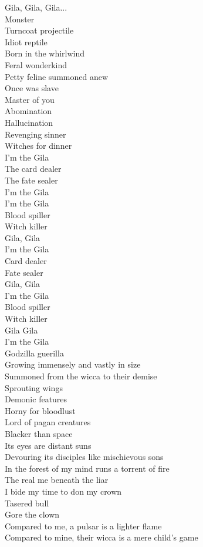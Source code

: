 Gila, Gila, Gila... \\
Monster \\

Turncoat projectile \\
Idiot reptile \\
Born in the whirlwind \\
Feral wonderkind \\
Petty feline summoned anew \\
Once was slave \\
Master of you \\
Abomination \\
Hallucination \\
Revenging sinner \\
Witches for dinner \\
I'm the Gila \\
The card dealer \\
The fate sealer \\
I'm the Gila \\

I'm the Gila \\
Blood spiller \\
Witch killer \\
Gila, Gila \\
I'm the Gila \\
Card dealer \\
Fate sealer \\
Gila, Gila \\
I'm the Gila \\
Blood spiller \\
Witch killer \\
Gila Gila \\
I'm the Gila \\
Godzilla guerilla \\

Growing immensely and vastly in size \\
Summoned from the wicca to their demise \\
Sprouting wings \\
Demonic features \\
Horny for bloodlust \\
Lord of pagan creatures \\
Blacker than space \\
Its eyes are distant suns \\
Devouring its disciples like mischievous sons \\
In the forest of my mind runs a torrent of fire \\
The real me beneath the liar \\
I bide my time to don my crown \\
Tasered bull \\
Gore the clown \\
Compared to me, a pulsar is a lighter flame \\
Compared to mine, their wicca is a mere child's game \\

